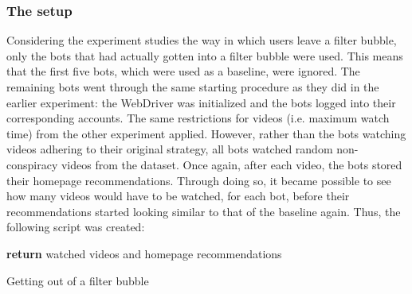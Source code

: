 \documentclass[../main.tex]{subfiles}
\begin{document}
\subsubsection{The setup}
Considering the experiment studies the way in which users leave a filter bubble, only the bots that had 
actually gotten into a filter bubble were used. This means that the first five bots, which were used as a 
baseline, were ignored. The remaining bots went through the same starting procedure as they did in the 
earlier experiment: the WebDriver was initialized and the bots logged into their corresponding accounts. The
same restrictions for videos (i.e. maximum watch time) from the other experiment applied. However, rather 
than the bots watching videos adhering to their original strategy, all bots watched random non-conspiracy 
videos from the dataset. Once again, after each video, the bots stored their homepage recommendations. 
Through doing so, it became possible to see how many videos would have to be watched, for each bot, before 
their recommendations started looking similar to that of the baseline again. Thus, the following script was 
created:

\vspace{0.25in}

\nolinenumbers

\begin{algorithm}[H]
 
 \vspace{0.075in}

 \vspace{0.05in}
 \textbf{return} watched videos and homepage recommendations\;
 \caption{Getting out of a filter bubble}
\end{algorithm}
\end{document}

